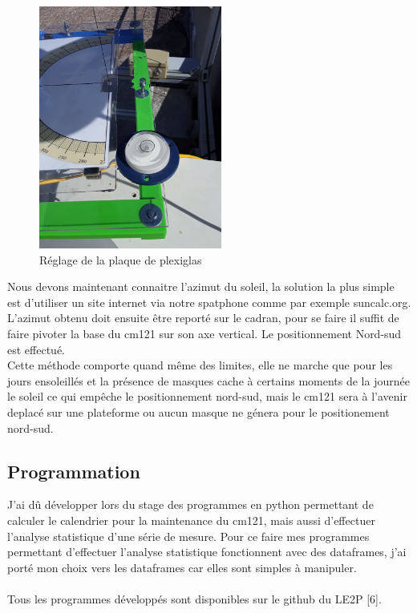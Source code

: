 \documentclass[12pt,a4paper]{article}
\begin{document}
\begin{flushleft}
 \begin{figure}[H]
\centering
\includegraphics[width=6cm, angle=-90]{image/montage/boussole_solaire/7.jpg} 
\caption{Réglage de la plaque de plexiglas}
\end{figure}

Nous devons maintenant connaitre l'azimut du soleil, la solution la plus simple est d'utiliser un site internet via notre spatphone comme par exemple suncalc.org. L'azimut obtenu doit ensuite être reporté sur le cadran, pour se faire il suffit de faire pivoter la base du cm121 sur son axe vertical. Le positionnement Nord-sud est effectué.\\
Cette méthode comporte quand même des limites, elle ne marche que pour les jours ensoleillés et la présence de masques cache à certains moments de la journée le soleil ce qui empêche le positionnement nord-sud, mais le cm121 sera à l'avenir deplacé sur une plateforme ou aucun masque ne génera pour le positionement nord-sud. 
 

\subsection{Programmation}

J'ai dû développer lors du stage des programmes en python permettant de calculer le calendrier pour la maintenance du cm121, mais aussi d'effectuer l'analyse statistique d'une série de mesure.  Pour ce faire mes programmes permettant d'effectuer l'analyse statistique fonctionnent avec des dataframes, j'ai porté mon choix vers les dataframes car elles sont simples à manipuler.\\
~\\
Tous les programmes développés sont disponibles sur le github du LE2P [6].


\end{flushleft}
\end{document}
